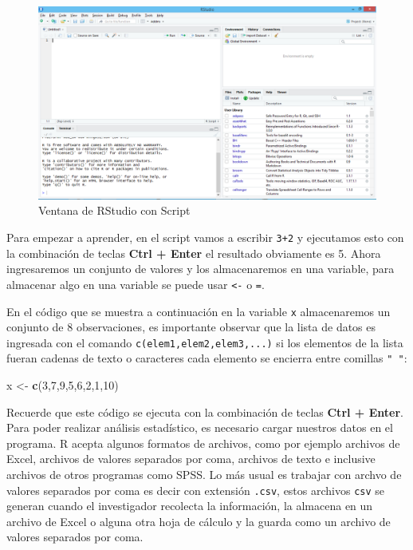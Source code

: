 \documentclass[letterpaper,]{book}
\newenvironment{Shaded}{\begin{snugshade}}{\end{snugshade}}
\newcommand{\DecValTok}[1]{\textcolor[rgb]{0.00,0.00,0.81}{#1}}
\newcommand{\KeywordTok}[1]{\textcolor[rgb]{0.13,0.29,0.53}{\textbf{#1}}}
\newcommand{\NormalTok}[1]{#1}
\newcommand{\StringTok}[1]{\textcolor[rgb]{0.31,0.60,0.02}{#1}}
\begin{document}
\begin{figure}[h!]

{\centering \includegraphics[width=0.5\linewidth]{rstudio2} 

}

\caption{Ventana de RStudio con Script}\label{fig:rstudio2}
\end{figure}

Para empezar a aprender, en el script vamos a escribir \texttt{3+2} y ejecutamos esto con la combinación de teclas \textbf{Ctrl + Enter} el resultado obviamente es 5. Ahora ingresaremos un conjunto de valores y los almacenaremos en una variable, para almacenar algo en una variable se puede usar \texttt{\textless{}-} o \texttt{=}.

En el código que se muestra a continuación en la variable \texttt{x} almacenaremos un conjunto de 8 observaciones, es importante observar que la lista de datos es ingresada con el comando \texttt{c(elem1,elem2,elem3,...)} si los elementos de la lista fueran cadenas de texto o caracteres cada elemento se encierra entre comillas \texttt{"\ "}:

\begin{Shaded}
\begin{Highlighting}[]
\NormalTok{x <-}\StringTok{ }\KeywordTok{c}\NormalTok{(}\DecValTok{3}\NormalTok{,}\DecValTok{7}\NormalTok{,}\DecValTok{9}\NormalTok{,}\DecValTok{5}\NormalTok{,}\DecValTok{6}\NormalTok{,}\DecValTok{2}\NormalTok{,}\DecValTok{1}\NormalTok{,}\DecValTok{10}\NormalTok{) }
\end{Highlighting}
\end{Shaded}

Recuerde que este código se ejecuta con la combinación de teclas \textbf{Ctrl + Enter}. Para poder realizar análisis estadístico, es necesario cargar nuestros datos en el programa. R acepta algunos formatos de archivos, como por ejemplo archivos de Excel, archivos de valores separados por coma, archivos de texto e inclusive archivos de otros programas como SPSS. Lo más usual es trabajar con archvo de valores separados por coma es decir con extensión \texttt{.csv}, estos archivos \texttt{csv} se generan cuando el investigador recolecta la información, la almacena en un archivo de Excel o alguna otra hoja de cálculo y la guarda como un archivo de valores separados por coma.
\end{document}
